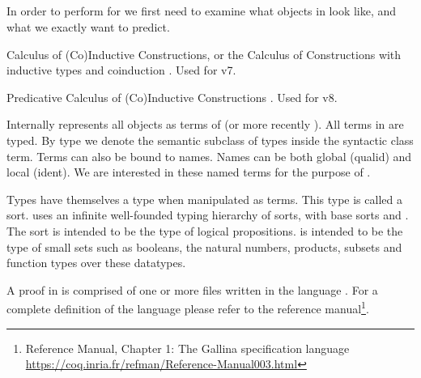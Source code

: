 
\subsection{\coq}

In order to perform \premiseselection for \coq we first need to examine what objects in \coq look like, and what we exactly want to predict.

\begin{definition}[\cic]
	Calculus of (Co)Inductive Constructions,
	or the Calculus of Constructions \cite{coquand1988calculus} with inductive types and coinduction \cite{huet1987induction} \cite{coquand1990inductively}.
	Used for \coq v7.
\end{definition}

\begin{definition}[\pcic]
	Predicative Calculus of (Co)Inductive Constructions \cite{bertot2013interactive}.
	Used for \coq v8.
\end{definition}

Internally \coq represents all objects as terms  of \cic (or more recently \pcic).
All terms in \coq are typed.
By type  we denote the semantic subclass of types inside the syntactic class term.
Terms can also be bound to names.
Names can be both global (qualid) and local (ident).
We are interested in these named terms for the purpose of \premiseselection.

Types have themselves a type when manipulated as terms.
This type is called a sort. 
\pcic uses an infinite well-founded typing hierarchy of sorts, with base sorts \sortprop and \sortset.
The sort \sortprop is intended to be the type of logical propositions.
\sortset is intended to be the type of small sets such as booleans, the natural numbers, products, subsets and function types over these datatypes.

A proof in \coq is comprised of one or more files written in the \gallina language \cite{huet1992gallina} .
For a complete definition of the \gallina language please refer to the \coq reference manual\footnote{\coq Reference Manual, Chapter 1: The Gallina specification language\\ \url{https://coq.inria.fr/refman/Reference-Manual003.html}}.

